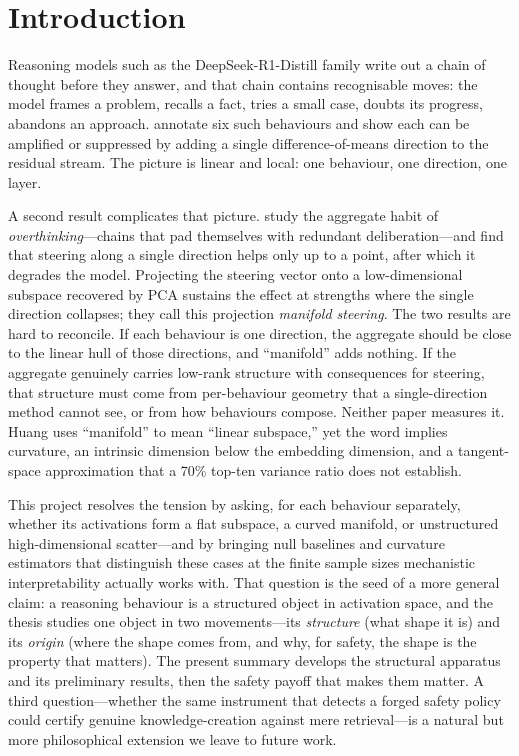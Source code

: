 \documentclass[10pt]{article}
\begin{document}
\section{Introduction}

Reasoning models such as the DeepSeek-R1-Distill family write out a
chain of thought before they answer, and that chain contains recognisable moves:
the model frames a problem, recalls a fact, tries a small case, doubts its
progress, abandons an approach. \citet{venhoff2025reasoning} annotate six such
behaviours and show each can be amplified or suppressed by adding a single
difference-of-means direction to the residual stream. The picture is linear and
local: one behaviour, one direction, one layer.

A second result complicates that picture. \citet{huang2025manifold} study the
aggregate habit of \emph{overthinking}---chains that pad themselves with
redundant deliberation---and find that steering along a single direction helps
only up to a point, after which it degrades the model. Projecting the steering
vector onto a low-dimensional subspace recovered by PCA sustains the effect at
strengths where the single direction collapses; they call this projection
\emph{manifold steering}. The two results are hard to reconcile. If each
behaviour is one direction, the aggregate should be close to the linear hull of
those directions, and ``manifold'' adds nothing. If the aggregate genuinely
carries low-rank structure with consequences for steering, that structure must
come from per-behaviour geometry that a single-direction method cannot see, or
from how behaviours compose. Neither paper measures it. Huang uses ``manifold''
to mean ``linear subspace,'' yet the word implies curvature, an intrinsic
dimension below the embedding dimension, and a tangent-space approximation that a
70\% top-ten variance ratio does not establish.

This project resolves the tension by asking, for each behaviour separately,
whether its activations form a flat subspace, a curved manifold, or unstructured
high-dimensional scatter---and by bringing null baselines and curvature estimators
that distinguish these cases at the finite sample sizes mechanistic
interpretability actually works with. That question is the seed of a more general
claim: a reasoning behaviour is a structured object in activation space, and the
thesis studies one object in two movements---its \emph{structure} (what shape it
is) and its \emph{origin} (where the shape comes from, and why, for safety, the
shape is the property that matters). The present summary develops the structural
apparatus and its preliminary results, then the safety payoff that makes them
matter. A third question---whether the same instrument that detects a forged safety
policy could certify genuine knowledge-creation against mere retrieval---is a
natural but more philosophical extension we leave to future work.
\end{document}
